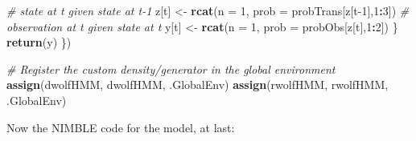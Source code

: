 \documentclass[
  12pt,
]{krantz}
\newenvironment{Shaded}{\begin{snugshade}}{\end{snugshade}}
\newcommand{\AttributeTok}[1]{\textcolor[rgb]{0.13,0.29,0.53}{#1}}
\newcommand{\CommentTok}[1]{\textcolor[rgb]{0.56,0.35,0.01}{\textit{#1}}}
\newcommand{\DecValTok}[1]{\textcolor[rgb]{0.00,0.00,0.81}{#1}}
\newcommand{\FunctionTok}[1]{\textcolor[rgb]{0.13,0.29,0.53}{\textbf{#1}}}
\newcommand{\NormalTok}[1]{#1}
\newcommand{\OtherTok}[1]{\textcolor[rgb]{0.56,0.35,0.01}{#1}}
\newcommand{\SpecialCharTok}[1]{\textcolor[rgb]{0.81,0.36,0.00}{\textbf{#1}}}
\newcommand{\StringTok}[1]{\textcolor[rgb]{0.31,0.60,0.02}{#1}}
\begin{document}
\begin{Shaded}
\begin{Highlighting}[]
      \CommentTok{\# state at t given state at t{-}1}
\NormalTok{      z[t] }\OtherTok{\textless{}{-}} \FunctionTok{rcat}\NormalTok{(}\AttributeTok{n =} \DecValTok{1}\NormalTok{, }\AttributeTok{prob =}\NormalTok{ probTrans[z[t}\DecValTok{{-}1}\NormalTok{],}\DecValTok{1}\SpecialCharTok{:}\DecValTok{3}\NormalTok{]) }
      \CommentTok{\# observation at t given state at t}
\NormalTok{      y[t] }\OtherTok{\textless{}{-}} \FunctionTok{rcat}\NormalTok{(}\AttributeTok{n =} \DecValTok{1}\NormalTok{, }\AttributeTok{prob =}\NormalTok{ probObs[z[t],}\DecValTok{1}\SpecialCharTok{:}\DecValTok{2}\NormalTok{]) }
\NormalTok{    \}}
    \FunctionTok{return}\NormalTok{(y)}
\NormalTok{  \})}

\CommentTok{\# Register the custom density/generator in the global environment}
\FunctionTok{assign}\NormalTok{(}\StringTok{\textquotesingle{}dwolfHMM\textquotesingle{}}\NormalTok{, dwolfHMM, .GlobalEnv)}
\FunctionTok{assign}\NormalTok{(}\StringTok{\textquotesingle{}rwolfHMM\textquotesingle{}}\NormalTok{, rwolfHMM, .GlobalEnv)}
\end{Highlighting}
\end{Shaded}

Now the NIMBLE code for the model, at last:
\end{document}
